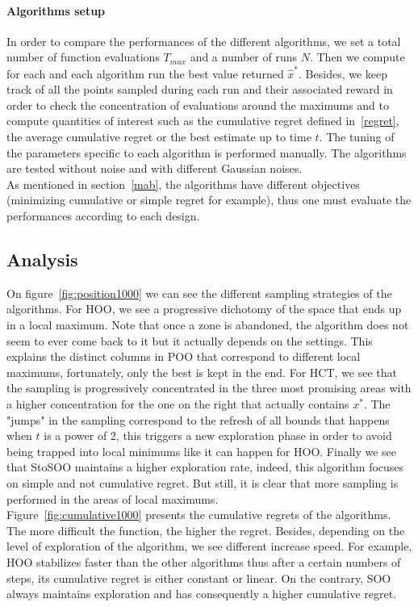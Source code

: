\documentclass[a4paper,10pt]{article}
\begin{document}
\paragraph{Algorithms setup}
In order to compare the performances of the different algorithms, we set a total number of function evaluations $T_{max}$ and a number of runs $N$. Then we compute for each and each algorithm run the best value returned $\widehat{x}^*$. Besides, we keep track of all the points sampled during each run and their associated reward in order to check the concentration of evaluations around the maximums and to compute quantities of interest such as the cumulative regret defined in~\ref{regret}, the average cumulative regret or the best estimate up to time $t$. The tuning of the parameters specific to each algorithm is performed manually. The algorithms are tested without noise and with different Gaussian noises.\\
As mentioned in section~\ref{mab}, the algorithms have different objectives (minimizing cumulative or simple regret for example), thus one must evaluate the performances according to each design.



\subsection{Analysis}
On figure~\ref{fig:position1000} we can see the different sampling strategies of the algorithms. For HOO, we see a progressive dichotomy of the space that ends up in a local maximum. Note that once a zone is abandoned, the algorithm does not seem to ever come back to it but it actually depends on the settings. This explains the distinct columns in POO that correspond to different local maximums, fortunately, only the best is kept in the end. For HCT, we see that the sampling is progressively concentrated in the three most promising areas with a higher concentration for the one on the right that actually contains $x^*$. The "jumps" in the sampling correspond to the refresh of all bounds that happens when $t$ is a power of 2, this triggers a new exploration phase in order to avoid being trapped into local minimums like it can happen for HOO. Finally we see that StoSOO maintains a higher exploration rate, indeed, this algorithm focuses on simple and not cumulative regret. But still, it is clear that more sampling is performed in the areas of local maximums.\\

Figure~\ref{fig:cumulative1000} presents the cumulative regrets of the algorithms. The more difficult the function, the higher the regret. Besides, depending on the level of exploration of the algorithm, we see different increase speed. For example, HOO stabilizes faster than the other algorithms thus after a certain numbers of steps, its cumulative regret is either constant or linear. On the contrary, SOO always maintains exploration and has consequently a higher cumulative regret.
\end{document}
